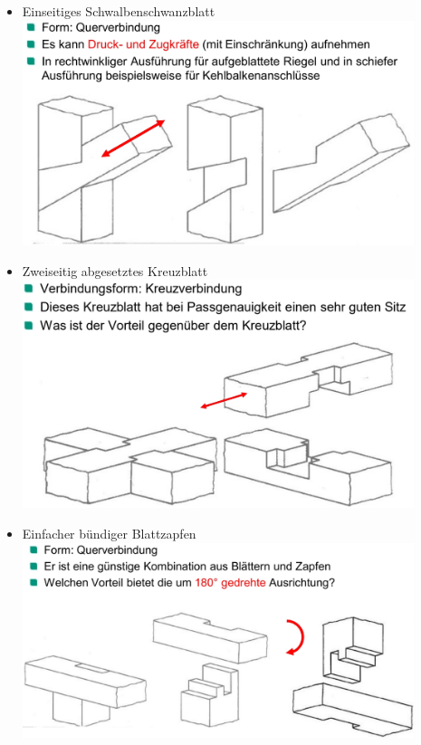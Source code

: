 \documentclass[fleqn,twoside]{article}
\begin{document}
    \begin{minipage}{0.45\textwidth}
        \begin{itemize}
                    \item Einseitiges Schwalbenschwanzblatt\\
                        \includegraphics[width=0.9\textwidth]{Grafiken/Zimmermansmaessige Verbindungen/Verbindungsarten/Einseitiges Schwalbenschwanzblatt.jpg}\\
                    \item Zweiseitig abgesetztes Kreuzblatt\\
                        \includegraphics[width=0.9\textwidth]{Grafiken/Zimmermansmaessige Verbindungen/Verbindungsarten/Zweiseitig abgesetztes Kreuzblatt.jpg}\\
                    \item Einfacher bündiger Blattzapfen\\
                        \includegraphics[width=0.9\textwidth]{Grafiken/Zimmermansmaessige Verbindungen/Verbindungsarten/Einfacher buendiger Blattzapfen.jpg}\\

\end{itemize}
\end{minipage}
\end{document}
